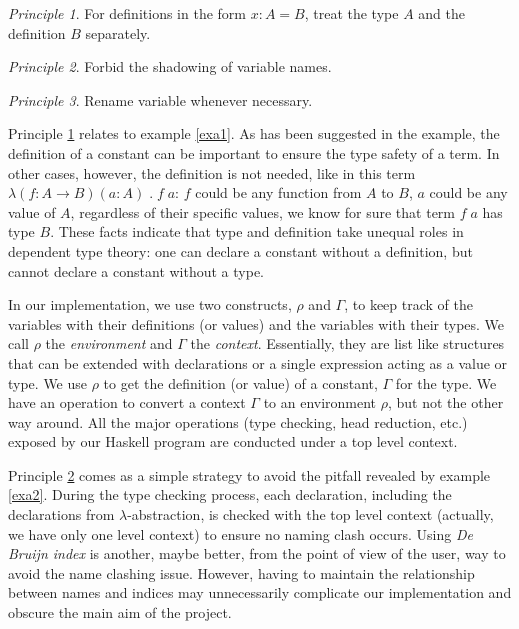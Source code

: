 \documentclass{article}
\theoremstyle{remark}
\newtheorem{principle}{Principle}
\begin{document}
\begin{principle} \label{p1}
  For definitions in the form $x : A = B$, treat the type $A$ and the definition $B$ separately.
\end{principle}

\begin{principle} \label{p2}
  Forbid the shadowing of variable names.
\end{principle}

\begin{principle} \label{p3}
  Rename variable whenever necessary. 
\end{principle}

Principle \ref{p1} relates to example \ref{exa1}. As has been suggested in the example, the definition of a constant can be important to ensure the type safety of a term. In other cases, however, the definition is not needed, like in this term $\lambda (f : A \to B) (a : A) \; . \; f \; a$: $f$ could be any function from $A$ to $B$, $a$ could be any value of $A$, regardless of their specific values, we know for sure that term $f \; a$ has type $B$. These facts indicate that type and definition take unequal roles in dependent type theory: one can declare a constant without a definition, but cannot declare a constant without a type.

In our implementation, we use two constructs, $\rho$ and $\Gamma$, to keep track of the variables with their definitions (or values) and the variables with their types. We call $\rho$ the \emph{environment} and $\Gamma$ the \emph{context}. Essentially, they are list like structures that can be extended with declarations or a single expression acting as a value or type. We use $\rho$ to get the definition (or value) of a constant, $\Gamma$ for the type. We have an operation to convert a context $\Gamma$ to an environment $\rho$, but not the other way around. All the major operations (type checking, head reduction, etc.) exposed by our Haskell program are conducted under a top level context.

Principle \ref{p2} comes as a simple strategy to avoid the pitfall revealed by example \ref{exa2}. During the type checking process, each declaration, including the declarations from $\lambda$-abstraction, is checked with the top level context (actually, we have only one level context) to ensure no naming clash occurs. Using \emph{De Bruijn index} is another, maybe better, from the point of view of the user, way to avoid the name clashing issue. However, having to maintain the relationship between names and indices may unnecessarily complicate our implementation and obscure the main aim of the project. 
\end{document}
